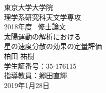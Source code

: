 \begin{titlepage}
\begin{spacing}{2.3}

\begin{center}
\vspace*{80truept}
{\huge 東京大学大学院}\\
{\huge 理学系研究科天文学専攻}\\
\vspace{20truept}
{\huge 2018年度 \ 修士論文}\\
\vspace{50truept}
{\huge 太陽運動の解析における\\星の速度分散の効果の定量評価}\\
\vspace{100truept}
{\LARGE 柏田 祐樹}\\ %
{\LARGE 学生証番号：35-176115}\\ %
{\LARGE 指導教員：郷田直輝}\\ %
{\LARGE 2019年1月28日}\\ %
\end{center}

\end{spacing}
\end{titlepage}